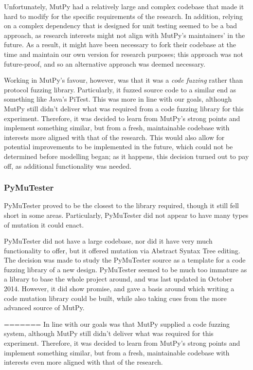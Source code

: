 \documentclass{sig-alternate}
\begin{document}
Unfortunately, MutPy had a relatively large and complex codebase\cite{mutpy26} that made it hard to modify for the specific requirements of the research. In addition, relying on a complex dependency that is designed for unit testing seemed to be a bad approach, as research interests might not align with MutPy's maintainers' in the future. As a result, it might have been necessary to fork their codebase at the time and maintain our own version for research purposes; this approach was not future-proof, and so an alternative approach was deemed necessary. \par

Working in MutPy's favour, however, was that it was a \emph{code fuzzing} rather than protocol fuzzing library. Particularly, it fuzzed source code to a similar end as something like Java's PiTest\cite{coles14pitest}. This was more in line with our goals, although MutPy still didn't deliver what was required from a code fuzzing library for this experiment. Therefore, it was decided to learn from MutPy's strong points and implement something similar, but from a fresh, maintainable codebase with interests more aligned with that of the research. This would also allow for potential improvements to be implemented in the future, which could not be determined before modelling began; as it happens, this decision turned out to pay off, as additional functionality was needed. \par

\subsubsection{PyMuTester}
\label{fuzzing_pymutester}
PyMuTester\cite{PyMutTester} proved to be the closest to the library required, though it still fell short in some areas. Particularly, PyMuTester did not appear to have many types of mutation it could enact. \par
PyMuTester did not have a large codebase\cite{PyMutTester}, nor did it have very much functionality to offer, but it offered mutation via Abstract Syntax Tree editing. The decision was made to study the PyMuTester source as a template for a code fuzzing library of a new design. PyMuTester seemed to be much too immature as a library to base the whole project around, and was last updated in October 2014. However, it did show promise, and gave a basis around which writing a code mutation library could be built, while also taking cues from the more advanced source of MutPy\cite{mutpy26}.  \par%
=======
In line with our goals was that MutPy supplied a code fuzzing system, although MutPy still didn't deliver what was required for this experiment. Therefore, it was decided to learn from MutPy's strong points and implement something similar, but from a fresh, maintainable codebase with interests even more aligned with that of the research. \par
\end{document}
